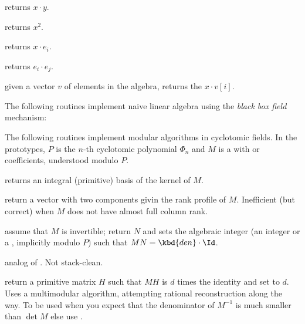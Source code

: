  returns $x\cdot y$.

 returns $x^2$.

 returns $x\cdot e_i$.

 returns $e_i\cdot e_j$.

 given a vector $v$ of elements
in the algebra, returns the $x\cdot v[i]$.

The following routines implement naive linear algebra using the \emph{black box
field} mechanism:







The following routines implement modular algorithms in cyclotomic fields. In
the prototypes, $P$ is the $n$-th cyclotomic polynomial $\Phi_n$ and $M$ is a
 with  or  coefficients, understood modulo $P$.

 returns an integral (primitive)
basis of the kernel of $M$.

 return a vector with two
  components givin the rank profile of $M$. Inefficient
(but correct) when $M$ does not have almost full column rank.

assume that $M$ is invertible; return $N$ and sets the algebraic integer
 (an integer or a , implicitly modulo $P$)
such that $M N = \kbd{den} \cdot \Id$.

 analog
of . Not stack-clean.

return a primitive matrix $H$ such that $M H$ is $d$ times the identity
and set  to $d$. Uses a multimodular algorithm, attempting
rational reconstruction along the way. To be used when you expect that the
denominator of $M^{-1}$ is much smaller than $\det M$ else use .

